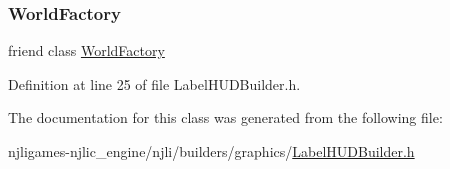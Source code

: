 \subsubsection{\texorpdfstring{World\+Factory}{WorldFactory}}
{\footnotesize\ttfamily friend class \mbox{\hyperlink{classnjli_1_1_world_factory}{World\+Factory}}\hspace{0.3cm}{\ttfamily [friend]}}



Definition at line 25 of file Label\+H\+U\+D\+Builder.\+h.



The documentation for this class was generated from the following file\+:\begin{DoxyCompactItemize}
\item 
njligames-\/njlic\+\_\+engine/njli/builders/graphics/\mbox{\hyperlink{_label_h_u_d_builder_8h}{Label\+H\+U\+D\+Builder.\+h}}\end{DoxyCompactItemize}
